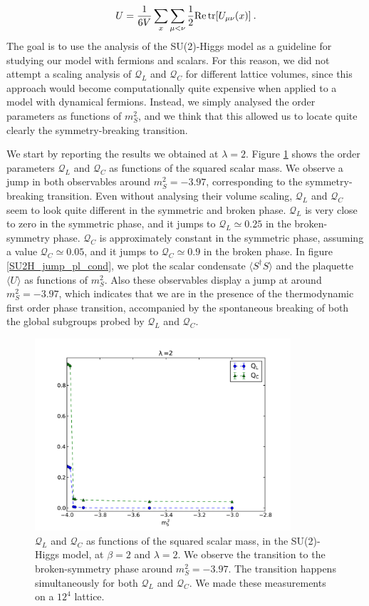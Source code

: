 \begin{equation}
U =  \frac{1}{6V} \sum_x \sum_{\mu < \nu} \frac{1}{2} \mathrm{Re} \tr[U_{\mu\nu}(x)] \: .
\end{equation}
%
The goal is to use the analysis of the SU(2)-Higgs model as a guideline for studying our model with fermions and scalars. For this reason, we did not attempt a scaling analysis of $\mathcal Q_L$ and $\mathcal Q_C$ for different lattice volumes, since this approach would become computationally quite expensive when applied to a model with dynamical fermions. Instead, we simply analysed the order parameters as functions of $m_S^2$, and we think that this allowed us to locate quite clearly the symmetry-breaking transition.

We start by reporting the results we obtained at $\lambda = 2$. Figure \ref{SU2H_jump_Q} shows the order parameters $\mathcal Q_L$ and $\mathcal Q_C$ as functions of the squared scalar mass. We observe a jump in both observables around $m_S^2 = -3.97$, corresponding to the symmetry-breaking transition. Even without analysing their volume scaling, $\mathcal Q_L$ and $\mathcal Q_C$ seem to look quite different in the symmetric and broken phase. $\mathcal Q_L$ is very close to zero in the symmetric phase, and  it jumps to $\mathcal Q_L \simeq 0.25$ in the broken-symmetry phase. $\mathcal Q_C$ is approximately constant in the symmetric phase, assuming a value $\mathcal Q_C \simeq 0.05$, and it jumps to $\mathcal Q_C \simeq 0.9$ in the broken phase. In figure \ref{SU2H_jump_pl_cond}, we plot the scalar condensate $\langle S^{\dagger}S \rangle$ and the plaquette $\langle U \rangle$ as functions of $m_S^2$. Also these observables display a jump at around $m_S^2 = -3.97$, which indicates that we are in the presence of the thermodynamic first order phase transition, accompanied by the spontaneous breaking of both the global subgroups probed by $\mathcal Q_L$ and $\mathcal Q_C$.


\begin{figure}[thb] 
\begin{center}
  \includegraphics[width=9.5cm,clip]{pics/SU2H_jump_Q}  
  \end{center}
  \caption{$\mathcal Q_L$ and $\mathcal Q_C$ as functions of the squared scalar mass, in the SU(2)-Higgs model, at $\beta =2$ and $\lambda = 2$. We observe the transition to the broken-symmetry phase around $m_S^2 = -3.97$. The transition happens simultaneously for both $\mathcal Q_L$ and $\mathcal Q_C$. We made these measurements on a $12^4$ lattice.}
  \label{SU2H_jump_Q}
\end{figure}


